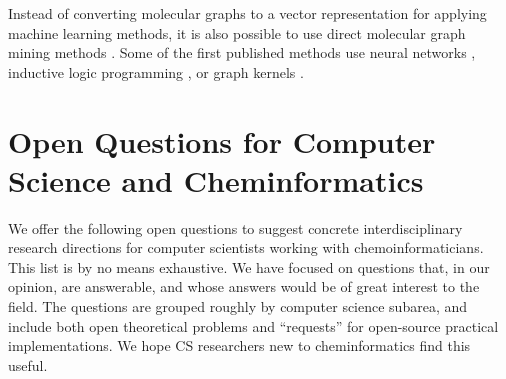 \documentclass{sig-alternate}
\begin{document}
Instead of converting molecular graphs to a vector representation for
applying machine learning methods, it is also possible to use direct
molecular graph mining methods \cite{okada2006}. Some of the first
published methods use neural networks \cite{kireev1995}, inductive
logic programming \cite{yh02a}, or graph kernels \cite{kti03}.
%
\section{Open Questions for Computer Science and Cheminformatics}
%
We offer the following open questions to suggest concrete interdisciplinary research directions for computer scientists working with chemoinformaticians.  This list is by no means exhaustive.  We have focused on questions that, in our opinion, are answerable, and whose answers would be of great interest to the field.  The questions are grouped roughly by computer science subarea, and include both open theoretical problems and ``requests'' for open-source practical implementations.  We hope CS researchers new to cheminformatics find this useful.
\end{document}
